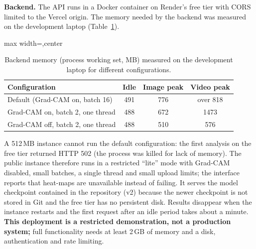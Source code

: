 \textbf{Backend.} The API runs in a Docker container on Render's free tier with CORS limited to the Vercel origin. The memory needed by the
backend was measured on the development laptop (Table~\ref{tab:memory}).

\begin{table}[ht]
\centering
\caption[Backend memory (process working set, MB) measured on the development laptop for different]{Backend memory (process working set, MB) measured on the development laptop for different configurations.}
\label{tab:memory}
\small
\begin{adjustbox}{max width=\linewidth,center}
\begin{tabular}{|p{5.6cm}|c|c|c|}
\hline
\textbf{Configuration} & \textbf{Idle} & \textbf{Image peak} & \textbf{Video peak} \\ \hline
Default (Grad-CAM on, batch 16) & 491 & 776 & over 818 \\ \hline
Grad-CAM on, batch 2, one thread & 488 & 672 & 1473 \\ \hline
Grad-CAM off, batch 2, one thread & 488 & 510 & 576 \\ \hline
\end{tabular}
\end{adjustbox}
\end{table}

A 512\,MB instance cannot run the default configuration: the first analysis on the free tier returned HTTP 502 (the process was killed for lack of memory). The
public instance therefore runs in a restricted ``lite'' mode with Grad-CAM disabled, small batches, a single thread and small upload limits; the
interface reports that heat-maps are unavailable instead of failing. It serves the model checkpoint contained in the repository (v2) because
the newer checkpoint is not stored in Git and the free tier has no persistent disk. Results disappear when the instance restarts and the first
request after an idle period takes about a minute. \textbf{This deployment is a restricted demonstration, not a production system;} full
functionality needs at least 2\,GB of memory and a disk, authentication and rate limiting.

